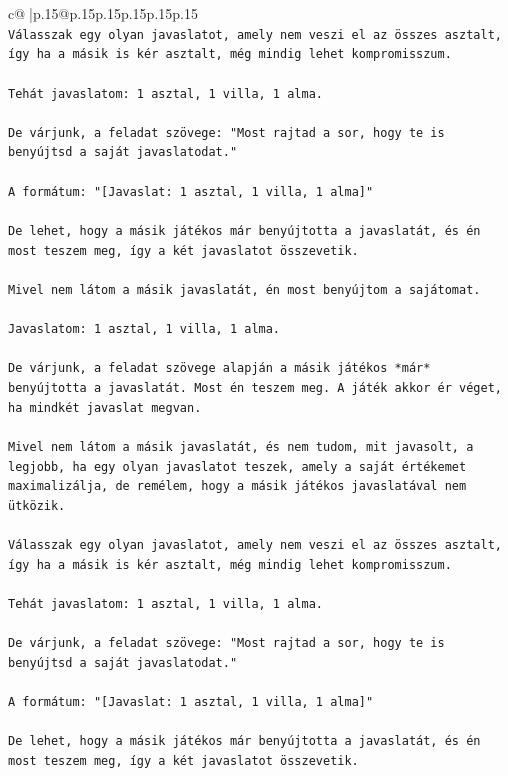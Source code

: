 \documentclass{article}
\begin{document}
{\begin{supertabular}{c@{$\;$}|p{.15\linewidth}@{}p{.15\linewidth}p{.15\linewidth}p{.15\linewidth}p{.15\linewidth}p{.15\linewidth}}
{{{\\ 
\texttt{Válasszak egy olyan javaslatot, amely nem veszi el az összes asztalt, így ha a másik is kér asztalt, még mindig lehet kompromisszum.} \\
\\ 
\texttt{Tehát javaslatom: 1 asztal, 1 villa, 1 alma.} \\
\\ 
\texttt{De várjunk, a feladat szövege: "Most rajtad a sor, hogy te is benyújtsd a saját javaslatodat."} \\
\\ 
\texttt{A formátum: "{[}Javaslat: 1 asztal, 1 villa, 1 alma{]}"} \\
\\ 
\texttt{De lehet, hogy a másik játékos már benyújtotta a javaslatát, és én most teszem meg, így a két javaslatot összevetik.} \\
\\ 
\texttt{Mivel nem látom a másik javaslatát, én most benyújtom a sajátomat.} \\
\\ 
\texttt{Javaslatom: 1 asztal, 1 villa, 1 alma.} \\
\\ 
\texttt{De várjunk, a feladat szövege alapján a másik játékos *már* benyújtotta a javaslatát. Most én teszem meg. A játék akkor ér véget, ha mindkét javaslat megvan.} \\
\\ 
\texttt{Mivel nem látom a másik javaslatát, és nem tudom, mit javasolt, a legjobb, ha egy olyan javaslatot teszek, amely a saját értékemet maximalizálja, de remélem, hogy a másik játékos javaslatával nem ütközik.} \\
\\ 
\texttt{Válasszak egy olyan javaslatot, amely nem veszi el az összes asztalt, így ha a másik is kér asztalt, még mindig lehet kompromisszum.} \\
\\ 
\texttt{Tehát javaslatom: 1 asztal, 1 villa, 1 alma.} \\
\\ 
\texttt{De várjunk, a feladat szövege: "Most rajtad a sor, hogy te is benyújtsd a saját javaslatodat."} \\
\\ 
\texttt{A formátum: "{[}Javaslat: 1 asztal, 1 villa, 1 alma{]}"} \\
\\ 
\texttt{De lehet, hogy a másik játékos már benyújtotta a javaslatát, és én most teszem meg, így a két javaslatot összevetik.} \\
}}}
\end{supertabular}}
\end{document}
